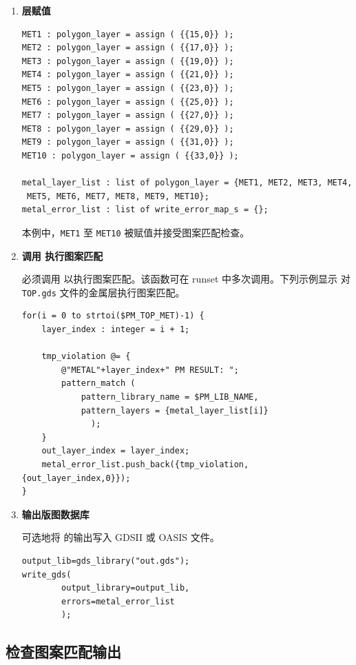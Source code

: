 \begin{enumerate}
  \item \textbf{层赋值}
\begin{lstlisting}[style=pxl]
MET1 : polygon_layer = assign ( {{15,0}} );
MET2 : polygon_layer = assign ( {{17,0}} );
MET3 : polygon_layer = assign ( {{19,0}} );
MET4 : polygon_layer = assign ( {{21,0}} );
MET5 : polygon_layer = assign ( {{23,0}} );
MET6 : polygon_layer = assign ( {{25,0}} );
MET7 : polygon_layer = assign ( {{27,0}} );
MET8 : polygon_layer = assign ( {{29,0}} );
MET9 : polygon_layer = assign ( {{31,0}} );
MET10 : polygon_layer = assign ( {{33,0}} );

metal_layer_list : list of polygon_layer = {MET1, MET2, MET3, MET4,
 MET5, MET6, MET7, MET8, MET9, MET10};
metal_error_list : list of write_error_map_s = {};
\end{lstlisting}

  本例中，\texttt{MET1} 至 \texttt{MET10} 被赋值并接受图案匹配检查。

  \item \textbf{调用  执行图案匹配}

  必须调用  以执行图案匹配。该函数可在 runset 中多次调用。下列示例显示  对 \texttt{TOP.gds} 文件的金属层执行图案匹配。
\begin{lstlisting}[style=pxl]
for(i = 0 to strtoi($PM_TOP_MET)-1) {
    layer_index : integer = i + 1;

    tmp_violation @= {
        @"METAL"+layer_index+" PM RESULT: ";
        pattern_match (
            pattern_library_name = $PM_LIB_NAME,
            pattern_layers = {metal_layer_list[i]}
              );
    }
    out_layer_index = layer_index;
    metal_error_list.push_back({tmp_violation,
{out_layer_index,0}});
}
\end{lstlisting}

  \item \textbf{输出版图数据库}

  可选地将  的输出写入 GDSII 或 OASIS 文件。
\begin{lstlisting}[style=pxl]
output_lib=gds_library("out.gds");
write_gds(
        output_library=output_lib,
        errors=metal_error_list
        );
\end{lstlisting}
\end{enumerate}

\subsection{检查图案匹配输出}
